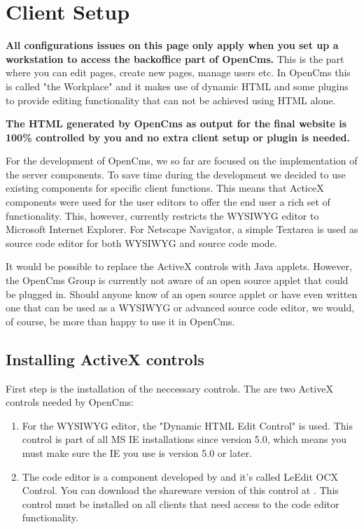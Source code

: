 \section{Client Setup}

\textbf{All configurations issues on this page only apply when you
set up a workstation to access the backoffice part of OpenCms.}
This is the part where you can edit pages, create new pages,
manage users etc. In OpenCms this is called "the Workplace" and it
makes use of dynamic HTML and some plugins to provide editing
functionality that can not be achieved using HTML alone.

\textbf{The HTML generated by OpenCms as output for the final
website is 100\% controlled by you and no extra client setup or
plugin is needed.}

For the development of OpenCms, we so far are focused on the
implementation of the server components. To save time during the
development we decided to use existing components for specific
client functions. This means that ActiceX components were used for
the user editors to offer the end user a rich set of
functionality. This, however, currently restricts the WYSIWYG
editor to Microsoft Internet Explorer. For Netscape Navigator, a
simple Textarea is used as source code editor for both WYSIWYG and
source code mode.

It would be possible to replace the ActiveX controls with Java
applets. However, the OpenCms Group is currently not aware of an
open source applet that could be plugged in. Should anyone know of
an open source applet or have even written one that can be used as
a WYSIWYG or advanced source code editor, we would, of course, be
more than happy to use it in OpenCms.


\subsection{Installing ActiveX controls}

First step is the installation of the neccessary controls. The are
two ActiveX controls needed by OpenCms:

\begin{enumerate}
\item For the WYSIWYG editor, the "Dynamic HTML Edit Control" is
used. This control is part of all MS IE installations since
version 5.0, which means you must make sure the IE you use is
version 5.0 or later.
\item The code editor is a component developed by  and it's
called LeEdit OCX Control. You can download the shareware version
of this control at
.
This control must be installed on all clients that need access to
the code editor functionality.
\end{enumerate}

